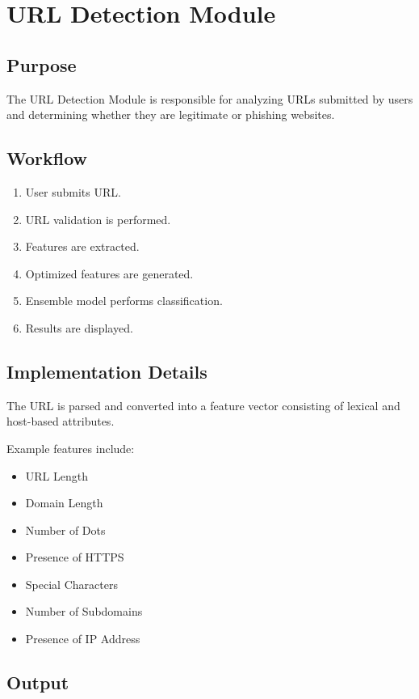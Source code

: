 \documentclass[12pt]{report}
\begin{document}
\section{URL Detection Module}

\subsection{Purpose}

The URL Detection Module is responsible for analyzing URLs submitted by users and determining whether they are legitimate or phishing websites.

\subsection{Workflow}

\begin{enumerate}
    \item User submits URL.
    \item URL validation is performed.
    \item Features are extracted.
    \item Optimized features are generated.
    \item Ensemble model performs classification.
    \item Results are displayed.
\end{enumerate}

\subsection{Implementation Details}

The URL is parsed and converted into a feature vector consisting of lexical and host-based attributes.

Example features include:

\begin{itemize}
    \item URL Length
    \item Domain Length
    \item Number of Dots
    \item Presence of HTTPS
    \item Special Characters
    \item Number of Subdomains
    \item Presence of IP Address
\end{itemize}

\subsection{Output}
\end{document}
